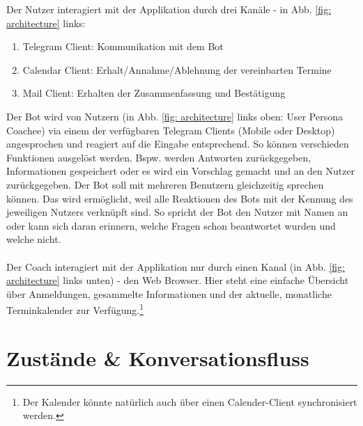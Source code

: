 	Der Nutzer interagiert mit der Applikation durch drei Kanäle - in Abb. \ref{fig: architecture} links:
	\begin{enumerate}
		\item Telegram Client: Kommunikation mit dem Bot
		\item Calendar Client: Erhalt/Annahme/Ablehnung der vereinbarten Termine
		\item Mail Client: Erhalten der Zusammenfassung und Bestätigung
	\end{enumerate}
	
	Der Bot wird von Nutzern (in Abb. \ref{fig: architecture} links oben: User Persona Coachee) via einem der verfügbaren Telegram Clients (Mobile oder Desktop) angesprochen und reagiert auf die Eingabe entsprechend. So können verschieden Funktionen ausgelöst werden. Bspw. werden Antworten zurückgegeben, Informationen gespeichert oder es wird ein Vorschlag gemacht und an den Nutzer zurückgegeben. Der Bot soll mit mehreren Benutzern gleichzeitig sprechen können. Das wird ermöglicht, weil alle Reaktionen des Bots mit der Kennung des jeweiligen Nutzers verknüpft sind. So spricht der Bot den Nutzer mit Namen an oder kann sich daran erinnern, welche Fragen schon beantwortet wurden und welche nicht. \\ \\
	
	Der Coach interagiert mit der Applikation nur durch einen Kanal (in Abb. \ref{fig: architecture} links unten) - den Web Browser. Hier steht eine einfache Übersicht über Anmeldungen, gesammelte Informationen und der aktuelle, monatliche Terminkalender zur Verfügung.\footnote{Der Kalender könnte natürlich auch über einen Calender-Client synchronisiert werden.}

\section{Zustände \& Konversationsfluss}

